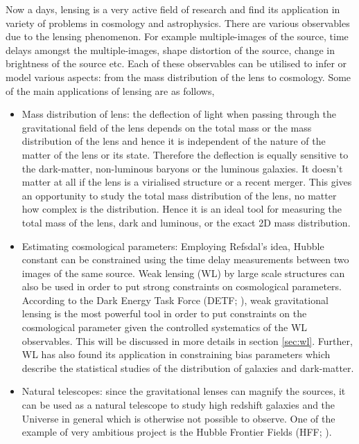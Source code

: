 Now a days, lensing is a very active field of research and find its application
in variety of problems in cosmology and astrophysics. 
There are various observables due to the lensing phenomenon. For example 
multiple-images of the source, time 
delays amongst the multiple-images, shape distortion of the source, change in brightness
of the source etc. Each of these observables can be utilised to infer or model various
aspects: from the mass distribution of the lens to cosmology. 
Some of the main applications of lensing are as follows,
\begin{itemize}
	\item Mass distribution of lens: the deflection of light when passing through
			the gravitational field of the lens depends on the total mass or the
			mass distribution of the lens and hence it is independent of the nature
			of the matter of the lens or its state. Therefore the
			deflection is equally sensitive to the dark-matter, non-luminous baryons
			or the luminous galaxies. It doesn't matter at all if the lens is a 
			virialised structure or a recent merger. This gives an opportunity to 
			study the total mass distribution of the lens, no matter how complex is 
			the distribution. Hence it is an ideal tool for measuring the total mass
			of the lens, dark and luminous, or the exact 2D mass distribution. 

	\item Estimating cosmological parameters: Employing Refsdal's idea, Hubble constant
			can be constrained using the time delay measurements between two images
			of the same source. Weak lensing (WL) by large scale structures 
			can also be used in order to put
			strong constraints on cosmological parameters. According to the Dark 
			Energy Task Force (DETF; \cite{2006astro.ph..9591A}), weak gravitational lensing is the most powerful
			tool in order to put constraints on the cosmological parameter given
			the controlled systematics of the WL observables. This will be discussed
			in more details in section \ref{sec:wl}. Further, WL has also found its application
			in constraining bias parameters which describe the statistical studies
			of the distribution of galaxies and dark-matter. 

	\item Natural telescopes: since the gravitational lenses can magnify the sources, it 
			can be used as a natural telescope to study high redshift galaxies and the Universe
			in general which is otherwise not possible to observe. One of the example of 
			very ambitious project is the Hubble Frontier Fields 
			(HFF; \cite{2014AAS...22325401L}). 
\end{itemize}



